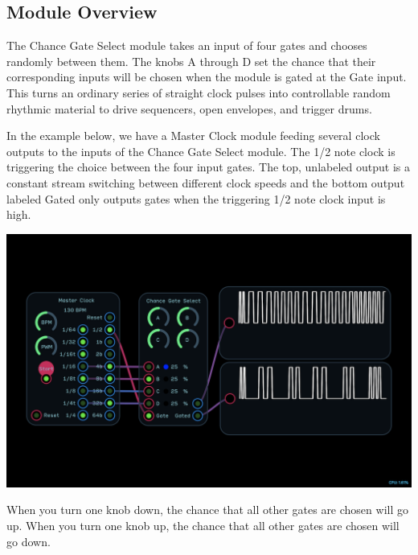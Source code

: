\documentclass[11pt]{book}
\begin{document}
\pagebreak

\begin{multicols*}{2}

\subsection*{Module Overview}

The Chance Gate Select module takes an input of four gates and chooses randomly between them. The knobs A through D set the chance that their corresponding inputs will be chosen when the module is gated at the Gate input. This turns an ordinary series of straight clock pulses into controllable random rhythmic material to drive sequencers, open envelopes, and trigger drums.

In the example below, we have a Master Clock module feeding several clock outputs to the inputs of the Chance Gate Select module. The 1/2 note clock is triggering the choice between the four input gates. The top, unlabeled output is a constant stream switching between different clock speeds and the bottom output labeled Gated only outputs gates when the triggering 1/2 note clock input is high.

\begin{center}
\includegraphics[width=0.95\linewidth]{chance-gate-select-fig1.png}
\end{center}

When you turn one knob down, the chance that all other gates are chosen will go up. When you turn one knob up, the chance that all other gates are chosen will go down.


\end{multicols*}
\end{document}
